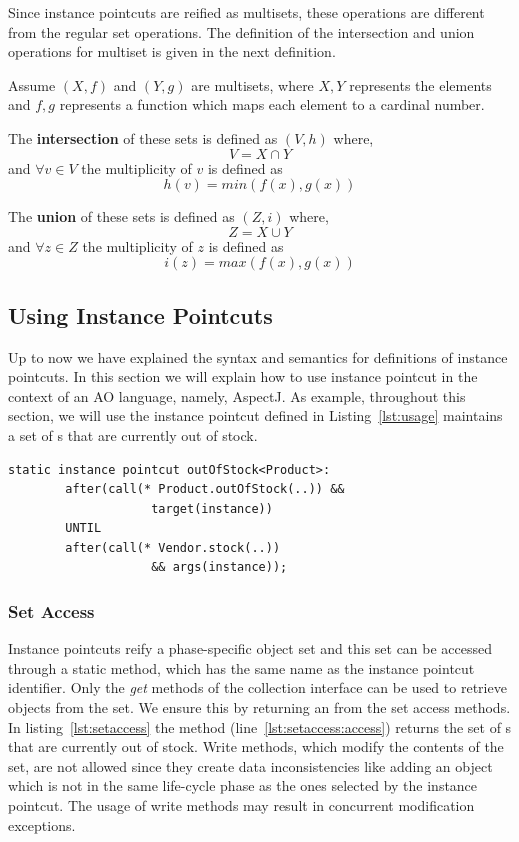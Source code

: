 Since instance pointcuts are reified as multisets, these operations are different from the regular set operations. The definition of the intersection and union operations for multiset is given in the next definition.

\begin{mydef}
\label{def:inun}
Assume $(X, f)$ and $(Y, g)$ are multisets, where $X, Y$ represents the elements and $f, g$ represents a function which maps each element to a cardinal number. 

The \textbf{intersection} of these sets is defined as $(V, h)$ where, 
\[V = X \cap Y\] and
$\forall v \in V$ the multiplicity of $v$ is defined as \[h(v) =  min(f(x),g(x))\]

The \textbf{union} of these sets is defined as $(Z, i)$ where, 
\[Z = X \cup Y\] and
$\forall z \in Z$ the multiplicity of $z$ is defined as \[i(z) =  max(f(x),g(x))\]
\end{mydef}

\subsection{Using Instance Pointcuts}
Up to now we have explained the syntax and semantics for definitions of instance pointcuts. In this section we will explain how to use instance pointcut in the context of an AO language, namely, AspectJ. As example, throughout this section, we will use the instance pointcut defined in Listing~\ref{lst:usage} maintains a set of s that are currently out of stock.

\begin{lstlisting}[float=h!, caption={An instance pointcut for out of stock products}, label={lst:usage}]
	static instance pointcut outOfStock<Product>: 
		after(call(* Product.outOfStock(..)) && 
					target(instance)) 
		UNTIL 
		after(call(* Vendor.stock(..)) 
					&& args(instance));
\end{lstlisting}

\subsubsection{Set Access}
Instance pointcuts reify a phase-specific object set and this set can be accessed through a static method, which has the same name as the instance pointcut identifier. Only the \emph{get} methods of the collection interface can be used to retrieve objects from the set. We ensure this by returning an  from the set access methods. In listing~\ref{lst:setaccess} the  method (line~\ref{lst:setaccess:access}) returns the set of s that are currently out of stock. Write methods, which modify the contents of the set, are not allowed since they create data inconsistencies like adding an object which is not in the same life-cycle phase as the ones selected by the instance pointcut. The usage of write methods may result in concurrent modification exceptions. 


